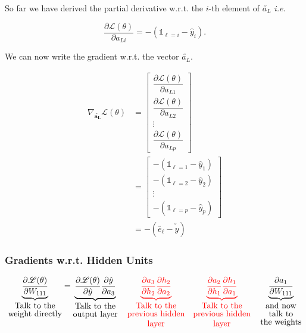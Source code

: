 \documentclass[11pt, a4paper]{article}
\begin{document}
So far we have derived the partial derivative w.r.t. the $i$-th element of $\utilde{a_L}$ \textit{i.e.}

$$\dfrac{\partial \mathscr{L}(\theta)}{\partial a_{Li}} = - \left( \mathds{1}_{\ell = i} - \hat{y}_i \right).$$

We can now write the gradient w.r.t. the vector $\utilde{a_L}$.

\begin{align*}
\nabla_{\mathbf{\utilde{a_L}}} \mathscr{L}(\theta)
&= \begin{bmatrix}
\dfrac{\partial \mathscr{L}(\theta)}{\partial a_{L1}} \\[1.5em]
\dfrac{\partial \mathscr{L}(\theta)}{\partial a_{L2}} \\[1.5em]
\vdots \\[1.5em]
\dfrac{\partial \mathscr{L}(\theta)}{\partial a_{Lp}}
\end{bmatrix} \\[2.5em]
&= \begin{bmatrix}
- \left( \mathds{1}_{\ell = 1} - \hat{y}_1 \right) \\[1.5em]
- \left( \mathds{1}_{\ell = 2} - \hat{y}_2 \right) \\[1.5em]
\vdots \\[1.5em]
- \left( \mathds{1}_{\ell = p} - \hat{y}_p \right)
\end{bmatrix} \\[2.5em]
&= - \left( \utilde{e_{\ell}} - \utilde{\hat{y}} \right)
\end{align*}



\subsubsection{Gradients w.r.t. Hidden Units}

\vspace{0.3cm}

$$\underbrace{\dfrac{\partial \mathscr{L}(\theta)}{\partial W_{111}}}_{\shortstack{Talk to the\\weight directly}}
=
\underbrace{\dfrac{\partial \mathscr{L}(\theta)}{\partial \hat{y}} \dfrac{\partial \hat{y}}{\partial a_3}}_{\shortstack{Talk to the\\output layer}} \,\,\,\,\,\,
\textcolor{red}{\underbrace{\dfrac{\partial a_3}{\partial h_2} \dfrac{\partial h_2}{\partial a_2}}_{\shortstack{Talk to the\\previous hidden\\layer}}} \,\,\,\,\,\,
\textcolor{red}{\underbrace{\dfrac{\partial a_2}{\partial h_1} \dfrac{\partial h_1}{\partial a_1}}_{\shortstack{Talk to the\\previous hidden\\layer}}} \,\,\,\,\,\,
\underbrace{\dfrac{\partial a_1}{\partial W_{111}}}_{\shortstack{and now\\talk to\\the weights}}$$
\end{document}

